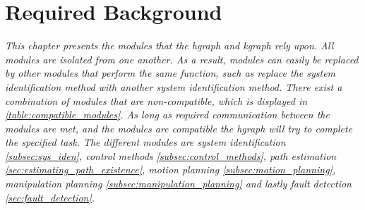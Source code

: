 \chapter{Required Background}%
\label{chap:required_background}
\textit{This chapter presents the modules that the \acl{hgraph} and \acl{kgraph} rely upon. All modules are isolated from one another. As a result, modules can easily be replaced by other modules that perform the same function, such as replace the system identification method with another system identification method. There exist a combination of modules that are non-compatible, which is displayed in \cref{table:compatible_modules}. As long as required communication between the modules are met, and the modules are compatible the \acl{hgraph} will try to complete the specified task. The different modules are system identification \cref{subsec:sys_iden}, control methods \cref{subsec:control_methods}, path estimation \cref{sec:estimating_path_existence}, motion planning \cref{subsec:motion_planning}, manipulation planning \cref{subsec:manipulation_planning} and lastly fault detection \cref{sec:fault_detection}.\bs}





